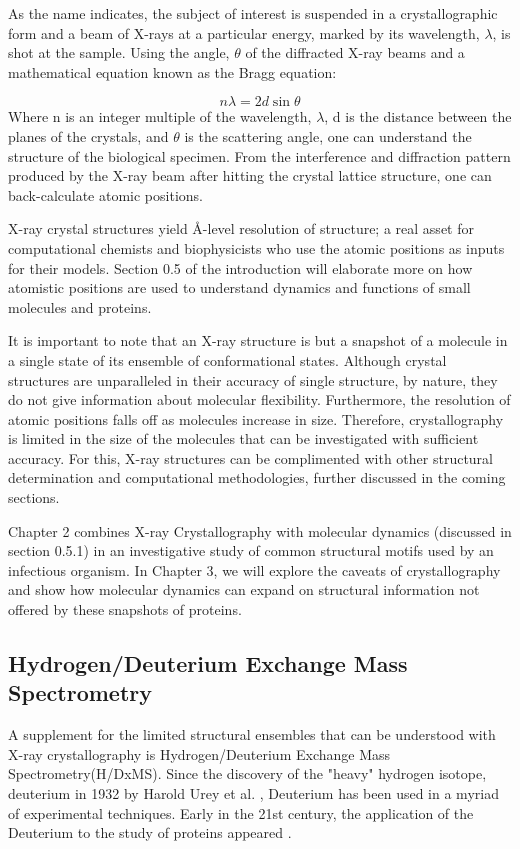 \documentclass[12pt]{ucsddissertation}
\begin{document}
\begin{dissertationintroduction}
As the name indicates, the subject of interest is suspended in a crystallographic form and a beam of X-rays at a particular energy, marked by its wavelength, $\lambda$, is shot at the sample. Using the angle, $\theta$ of the diffracted X-ray beams and a mathematical equation known as the Bragg equation: 

\begin{equation}
n\lambda=2d\sin\theta
\end{equation}
Where n is an integer multiple of the wavelength, $\lambda$, d is the distance between the planes of the crystals, and $\theta$ is the scattering angle, one can understand the structure of the biological specimen. From the interference and diffraction pattern produced by the X-ray beam after hitting the crystal lattice structure, one can back-calculate atomic positions. 

X-ray crystal structures yield \si{\angstrom}-level resolution of structure; a real asset for computational chemists and biophysicists who use the atomic positions as inputs for their models. Section 0.5 of the introduction will elaborate more on how atomistic positions are used to understand dynamics and functions of small molecules and proteins. 

It is important to note that an X-ray structure is but a snapshot of a molecule in a single state of its ensemble of conformational states. Although crystal structures are unparalleled in their accuracy of single structure, by nature, they do not give information about molecular flexibility.  Furthermore, the resolution of atomic positions falls off as molecules increase in size. Therefore, crystallography is limited in the size of the molecules that can be investigated with sufficient accuracy. For this, X-ray structures can be complimented with other structural determination and computational methodologies, further discussed in the coming sections. 

Chapter 2 combines X-ray Crystallography with molecular dynamics (discussed in section 0.5.1) in an investigative study of common structural motifs used by an infectious organism. In Chapter 3, we will explore the caveats of crystallography and show how molecular dynamics can expand on structural information not offered by these snapshots of proteins. 

\subsection{Hydrogen/Deuterium Exchange Mass Spectrometry}
A supplement for the limited structural ensembles that can be understood with X-ray crystallography is Hydrogen/Deuterium Exchange Mass Spectrometry(H/DxMS).  Since the discovery of the "heavy" hydrogen isotope, deuterium in 1932 by Harold Urey et al. \cite{Urey1932}, Deuterium has been used in a myriad of experimental techniques. Early in the 21st century, the application of the Deuterium to the study of proteins appeared \cite{Engen2001}. 


\end{dissertationintroduction}
\end{document}
